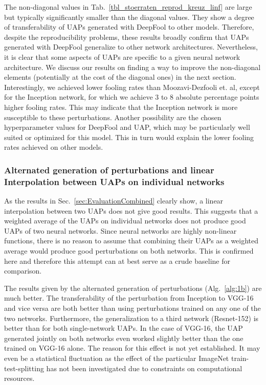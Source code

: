\documentclass[runningheads]{llncs}
\begin{document}
The non-diagonal values in Tab.~\ref{tbl_stoerraten_reprod_kreuz_linf} are large but typically significantly smaller than the diagonal values. They show a degree of transferability of UAPs generated with DeepFool to other models. Therefore, despite the reproducibility problems, these results broadly confirm that UAPs generated with DeepFool generalize to other network architectures. Nevertheless, it is clear that some aspects of UAPs are specific to a given neural network architecture. We discuss our results on finding a way to improve the non-diagonal elements (potentially at the cost of the diagonal ones) in the next section.
Interestingly, we achieved lower fooling rates than Moozavi-Dezfooli et. al, except for the Inception network, for which we achieve 3 to 8 absolute percentage points higher fooling rates. This may indicate that the Inception network is more susceptible to these perturbations. Another possibility are the chosen hyperparameter values for DeepFool and UAP, which may be particularly well suited or optimized for this model. This in turn would explain the lower fooling rates achieved on other models.

\subsubsection{Alternated generation of perturbations and linear Interpolation be\-tween UAPs on individual networks}
As the results in Sec.~\ref{sec:EvaluationCombined} clearly show, a linear interpolation between two UAPs does not give good results. This suggests that a weighted average of the UAPs on individual networks does not produce good UAPs of two neural networks. Since neural networks are highly non-linear functions, there is no reason to assume that combining their UAPs as a weighted average would produce good perturbations on both networks. This is confirmed here and therefore this attempt can at best serve as a crude baseline for comparison. 

The results given by the alternated generation of perturbations (Alg.~\ref{alg:1b}) are much better. The transferability of the perturbation from Inception to VGG-16 and vice versa are both better than using perturbations trained on any one of the two networks. Furthermore, the generalization to a third network (Resnet-152) is better than for both single-network UAPs. In the case of VGG-16, the UAP generated jointly on both networks even worked slightly better than the one trained on VGG-16 alone. The reason for this effect is not yet established. It may even be a statistical fluctuation as the effect of the particular ImageNet train-test-splitting has not been investigated due to constraints on computational resources. 
\end{document}
